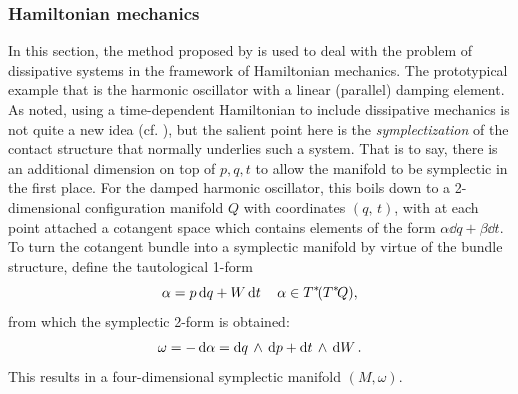 \subsubsection{Hamiltonian mechanics}
\label{sssec:mendel_hamiltonian}
In this section, the method proposed by \citet{Mendel2021} is used to deal with the problem of dissipative systems in the framework of Hamiltonian mechanics. The prototypical example that is the harmonic oscillator with a linear (parallel) damping element. As noted, using a time-dependent Hamiltonian to include dissipative mechanics is not quite a new idea (cf. \citet{Dekker1981}), but the salient point here is the \emph{symplectization} of the contact structure that normally underlies such a system. That is to say, there is an additional dimension on top of $p, q, t$ to allow the manifold to be symplectic in the first place. For the damped harmonic oscillator, this boils down to a 2-dimensional configuration manifold $Q$ with coordinates $(q,\,t)$, with at each point attached a cotangent space which contains elements of the form $\alpha\dd{q} + \beta\dd{t}$. To turn the cotangent bundle into a symplectic manifold by virtue of the bundle structure, define the tautological 1-form
$$ \alpha = p\dd{q} + W\dd{t} \quad \alpha \in T^*\!(T^*\!Q),$$
from which the symplectic 2-form is obtained:
$$ \omega = -\dd{\alpha} =  \dd{q}\,\wedge\,\dd{p}  +  \dd{t}\,\wedge\,\dd{W} .$$
This results in a four-dimensional symplectic manifold $(M, \omega)$. 

